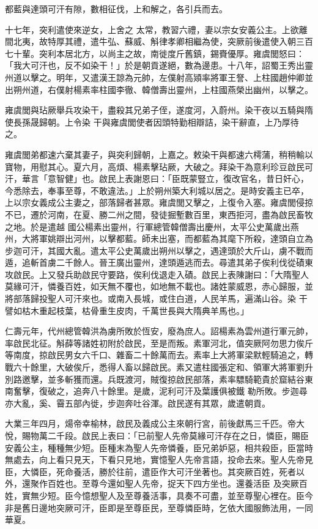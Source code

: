 \begin{pinyinscope}
 都藍與達頭可汗有隙，數相征伐，上和解之，各引兵而去。



 十七年，突利遣使來逆女，上舍之
 太常，教習六禮，妻以宗女安義公主。上欲離間北夷，故特厚其禮，遣牛弘、蘇威、斛律孝卿相繼為使，突厥前後遣使入朝三百七十輩。突利本居北方，以尚主之故，南徙度斤舊鎮，錫賚優厚。雍虞閭怒曰：「我大可汗也，反不如染干！」於是朝貢遂絕，數為邊患。十八年，詔蜀王秀出靈州道以擊之。明年，又遣漢王諒為元帥，左僕射高熲率將軍王詧、上柱國趙仲卿並出朔州道，右僕射楊素率柱國李徹、韓僧壽出靈州，上柱國燕榮出幽州，以擊之。



 雍虞閭與玷厥舉兵攻染干，盡殺其兄弟子侄，遂度河，入蔚州。染干夜以五騎與隋使長孫晟歸朝。上令染
 干與雍虞閭使者因頭特勤相辯詰，染干辭直，上乃厚待之。



 雍虞閭弟都速六棄其妻子，與突利歸朝，上嘉之。敕染干與都速六樗蒲，稍稍輸以寶物，用慰其心。夏六月，高煩、楊素擊玷厥，大破之。拜染干為意利珍豆啟民可汗，華言「意智健」也。啟民上表謝恩曰：「臣既蒙豎立，復改官名，昔日奸心，今悉除去，奉事至尊，不敢違法。」上於朔州築大利城以居之。是時安義主已卒，上以宗女義成公主妻之，部落歸者甚眾。雍虞閭又擊之，上復令入塞。雍虞閭侵掠不已，遷於河南，在夏、勝二州之間，發徒掘塹數百里，東西拒河，盡為啟民畜牧之地。於是遣越
 國公楊素出靈州，行軍總管韓僧壽出慶州，太平公史萬歲出燕州，大將軍姚辯出河州，以擊都藍。師未出塞，而都藍為其麾下所殺，達頭自立為步迦可汗，其國大亂。遣太平公史萬歲出朔州以擊之，遇達頭於大斤山，虜不戰而遁，追斬首虜二千餘人。晉王廣出靈州，達頭遁逃而去。尋遣其弟子俟利伐從磧東攻啟民。上又發兵助啟民守要路，俟利伐退走入磧。啟民上表陳謝曰：「大隋聖人莫緣可汗，憐養百姓，如天無不覆也，如地無不載也。諸姓蒙威恩，赤心歸服，並將部落歸投聖人可汗來也。或南入長城，或住白道，人民羊馬，遍滿山谷。染
 干譬如枯木重起枝葉，枯骨重生皮肉，千萬世長與大隋典羊馬也。」



 仁壽元年，代州總管韓洪為虜所敗於恆安，廢為庶人。詔楊素為雲州道行軍元帥，率啟民北征。斛薛等諸姓初附於啟民，至是而叛。素軍河北，值突厥阿勿思力俟斤等南度，掠啟民男女六千口、雜畜二十餘萬而去。素率上大將軍梁默輕騎追之，轉戰六十餘里，大破俟斤，悉得人畜以歸啟民。素又遣柱國張定和、領軍大將軍劉升別路邀擊，並多斬獲而還。兵既渡河，賊復掠啟民部落，素率驃騎範貴於窟結谷東南奮擊，復破之，追奔八十餘里。是歲，泥利可汗及葉護俱被鐵
 勒所敗。步迦尋亦大亂，奚、霫五部內徙，步迦奔吐谷渾。啟民遂有其眾，歲遣朝貢。



 大業三年四月，煬帝幸榆林，啟民及義成公主來朝行宮，前後獻馬三千匹。帝大悅，賜物萬二千段。啟民上表曰：「已前聖人先帝莫緣可汗存在之日，憐臣，賜臣安義公主，種種無少短。臣種末為聖人先帝憐養，臣兄弟妒惡，相共殺臣，臣當時無處去，向上看只見天，下看只見地，實憶聖人先帝言語，投命去來。聖人先帝見臣，大憐臣，死命養活，勝於往前，遣臣作大可汗坐著也。其突厥百姓，死者以外，還聚作百姓也。至尊今還如聖人先帝，捉天下四方坐也。還養活臣
 及突厥百姓，實無少短。臣今憶想聖人及至尊養活事，具奏不可盡，並至尊聖心裡在。臣今非是舊日邊地突厥可汗，臣即是至尊臣民，至尊憐臣時，乞依大國服飾法用，一同華夏。




\end{pinyinscope}
